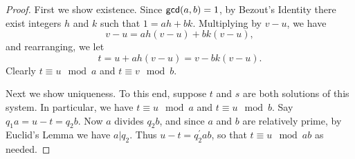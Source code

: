 \begin{proof}
First we show existence.
Since \(\mathsf{gcd}(a, b) = 1\), by Bezout's Identity there exist integers \(h\) and \(k\) such that \(1 = ah + bk\).
Multiplying by \(v-u\), we have \[ v-u = ah(v-u) + bk(v-u), \] and rearranging, we let \[ t = u + ah(v-u) = v - bk(v-u). \]
Clearly \(t \equiv u \mod a\) and \(t \equiv v \mod b\).

Next we show uniqueness.
To this end, suppose \(t\) and \(s\) are both solutions of this system.
In particular, we have \(t \equiv u \mod a\) and \(t \equiv u \mod b\).
Say \(q_1a = u - t = q_2b\).
Now \(a\) divides \(q_2b\), and since \(a\) and \(b\) are relatively prime, by Euclid's Lemma we have \(a|q_2\).
Thus \(u-t = q_2^\prime ab\), so that \(t \equiv u \mod ab\) as needed.
\end{proof}
